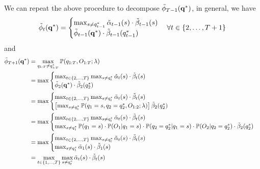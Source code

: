 We can repeat the above procedure to decompose $\tilde{\phi}_{T-1}(\mathbf{q}^*)$, in general, we have
\begin{equation*}
\begin{aligned}
\tilde{\phi}_t(\mathbf{q}^*) = \begin{cases}
                  \max_{s \ne q_{t-1}^*} \tilde{\alpha}_{t-1}(s) \cdot \tilde{\beta}_{t-1}(s) \\
                  \tilde{\phi}_{t-1}(\mathbf{q}^*) \cdot \tilde{\beta}_{t-1}(q_{t-1}^*)
                \end{cases}  \forall t \in \{2,\dots,T+1\} \\
\end{aligned}
\end{equation*}
and 
\begin{align*}
\tilde{\phi}_{T+1}(\mathbf{q}^*) 
&= \max_{q_{1:T} \ne q_{1:T}^*} \mathbb{P}(q_{1:T}, O_{1:T}; \lambda) \\
&= \max \begin{cases}
          \max_{t \in \{2,\dots,T\}} \max_{s \ne q_t^*} \tilde{\alpha}_t(s) \cdot \tilde{\beta}_t(s) \\
          \tilde{\phi}_2(\mathbf{q}^*) \cdot \tilde{\beta}_2(q_2^*)
        \end{cases} \\
&= \max \begin{cases}
          \max_{t \in \{2,\dots,T\}} \max_{s \ne q_t^*} \tilde{\alpha}_t(s) \cdot \tilde{\beta}_t(s) \\
          \left[ \max_{s \ne q_1^*} \mathbb{P}(q_1 = s, q_2 = q_2^*, O_{1:2}; \lambda) \right] \tilde{\beta}_2(q_2^*)
        \end{cases} \\
&= \max \begin{cases}
          \max_{t \in \{2,\dots,T\}} \max_{s \ne q_t^*} \tilde{\alpha}_t(s) \cdot \tilde{\beta}_t(s) \\
          \max_{s \ne q_1^*} \mathbb{P}(q_1 = s) \cdot \mathbb{P}(O_1 |q_1 = s) \cdot \mathbb{P}(q_2 = q_2^* |q_1 = s) \cdot \mathbb{P}(O_2 |q_2 = q_2^*) \cdot \tilde{\beta}_2(q_2^*)
        \end{cases} \\
&= \max \begin{cases}
          \max_{t \in \{2,\dots,T\}} \max_{s \ne q_t^*} \tilde{\alpha}_t(s) \cdot \tilde{\beta}_t(s) \\
          \max_{s \ne q_1^*} \tilde{\alpha}_1(s) \cdot \tilde{\beta}_1(s)
        \end{cases} \\
&= \max_{t \in \{1,\dots,T\}} \max_{s \ne q_t^*} \tilde{\alpha}_t(s) \cdot \tilde{\beta}_t(s)
\end{align*}
